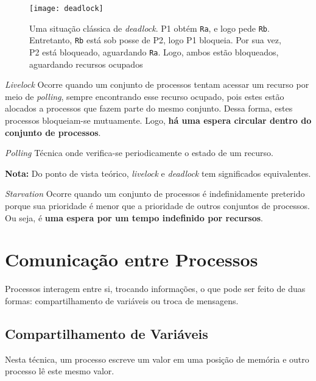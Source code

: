 \begin{figure}[ht]
  \centering
  \texttt{[image: deadlock]}
  \caption{Uma situação clássica de \textit{deadlock}. P1 obtém \texttt{Ra}, e logo pede \texttt{Rb}. Entretanto, \texttt{Rb} está sob posse de P2, logo P1 bloqueia. Por sua vez, P2 está bloqueado, aguardando \texttt{Ra}. Logo, ambos estão bloqueados, aguardando recursos ocupados}
  \label{fig:deadlock}
\end{figure}

\begin{definicao}{\textit{Livelock}}
  Ocorre quando um conjunto de processos tentam acessar um recurso por meio de \textit{polling}, sempre encontrando esse recurso ocupado, pois estes estão alocados a processos que fazem parte do mesmo conjunto. Dessa forma, estes processos bloqueiam-se mutuamente. Logo, \textbf{há uma espera circular dentro do conjunto de processos}.
\end{definicao}


\begin{definicao}{\textit{Polling}}
  Técnica onde verifica-se periodicamente o estado de um recurso.
\end{definicao}

\textbf{Nota:} Do ponto de vista teórico, \textit{livelock} e \textit{deadlock} tem significados equivalentes.

\begin{definicao}{\textit{Starvation}}
  Ocorre quando um conjunto de processos é indefinidamente preterido porque sua prioridade é menor que a prioridade de outros conjuntos de processos. Ou seja, é \textbf{uma espera por um tempo indefinido por recursos}.
\end{definicao}










\section{Comunicação entre Processos}
Processos interagem entre si, trocando informações, o que pode ser feito de duas formas: compartilhamento de variáveis ou troca de mensagens.


\subsection{Compartilhamento de Variáveis}
Nesta técnica, um processo escreve um valor em uma posição de memória e outro processo lê este mesmo valor.

